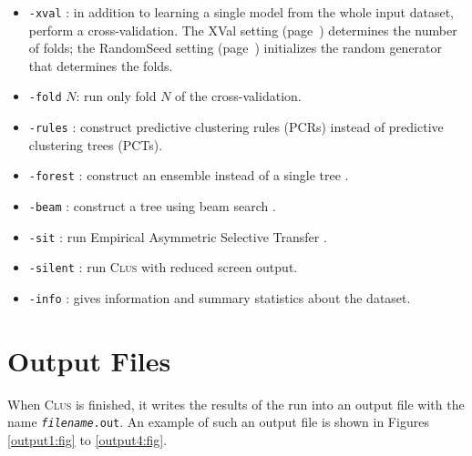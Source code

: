 \documentclass[a4paper]{report}
\newcommand{\clus}{\textsc{Clus}}
\begin{document}
\begin{itemize}
\item {\tt -xval} : in addition to learning a single model from the whole input dataset, perform a cross-validation.  The XVal setting (page~\pageref{sett:xval}) determines the number of folds; the RandomSeed setting (page~\pageref{sett:seed}) initializes the random generator that determines the folds.

\item {\tt -fold} $N$: run only fold $N$ of the cross-validation.

\item {\tt -rules} : construct predictive clustering rules (PCRs) instead of predictive clustering trees (PCTs).

\item {\tt -forest} : construct an ensemble instead of a single tree \cite{Kocev07b:proc}.

\item {\tt -beam} : construct a tree using beam search \cite{Kocev07a:proc}.

\item {\tt -sit} : run Empirical Asymmetric Selective Transfer \cite{Piccart08-DS:proc}.

\item {\tt -silent} : run \clus{} with reduced screen output.

\item {\tt -info} : gives information and summary statistics about the dataset.
\end{itemize}


\chapter{Output Files}
\label{ch:output}

When \clus{} is finished, it writes the results of the run into an output file with the name
{\tt {\em filename}.out}.  An example of such an output file is shown in Figures \ref{output1:fig} to \ref{output4:fig}.
\end{document}
